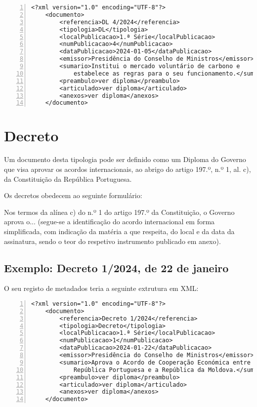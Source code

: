 \begin{Verbatim}[frame=single, numbers=left, fontsize=\small, commandchars=\\\{\}]
<?xml version="1.0" encoding="UTF-8"?>
    <documento>
        <referencia>DL 4/2024</referencia>
        <tipologia>DL</tipologia>
        <localPublicacao>1.ª Série</localPublicacao>
        <numPublicacao>4</numPublicacao>
        <dataPublicacao>2024-01-05</dataPublicacao>
        <emissor>Presidência do Conselho de Ministros</emissor>
        <sumario>Institui o mercado voluntário de carbono e 
            estabelece as regras para o seu funcionamento.</sumario>
        <preambulo>ver diploma</preambulo>
        <articulado>ver diploma</articulado>
        <anexos>ver diploma</anexos>
    </documento>
\end{Verbatim}


\section{Decreto}

Um documento desta tipologia pode ser definido como um Diploma do Governo que visa aprovar 
os acordos internacionais, ao abrigo do artigo 197.º, n.º 1, al. c), da Constituição da 
República Portuguesa.

Os decretos obedecem ao seguinte formulário:

\begin{quoting}
    Nos termos da alínea c) do n.º 1 do artigo 197.º da Constituição, o Governo aprova 
    o... (segue-se a identificação do acordo internacional em forma simplificada, com 
    indicação da matéria a que respeita, do local e da data da assinatura, sendo o 
    teor do respetivo instrumento publicado em anexo).
\end{quoting}


\subsection{Exemplo: Decreto 1/2024, de 22 de janeiro} 
    
O seu registo de metadados teria a seguinte extrutura em XML:
    
\begin{Verbatim}[frame=single, numbers=left, fontsize=\small, commandchars=\\\{\}]
<?xml version="1.0" encoding="UTF-8"?>
    <documento>
        <referencia>Decreto 1/2024</referencia>
        <tipologia>Decreto</tipologia>
        <localPublicacao>1.ª Série</localPublicacao>
        <numPublicacao>1</numPublicacao>
        <dataPublicacao>2024-01-22</dataPublicacao>
        <emissor>Presidência do Conselho de Ministros</emissor>
        <sumario>Aprova o Acordo de Cooperação Económica entre a 
            República Portuguesa e a República da Moldova.</sumario>
        <preambulo>ver diploma</preambulo>
        <articulado>ver diploma</articulado>
        <anexos>ver diploma</anexos>
    </documento>
\end{Verbatim}


